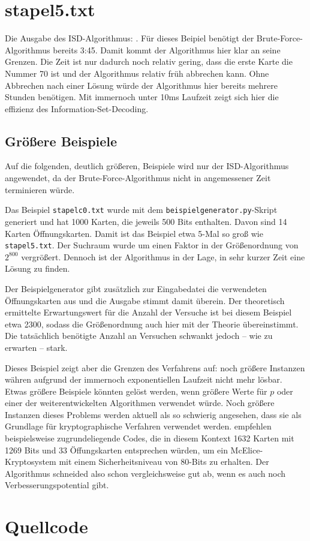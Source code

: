 \documentclass[a4paper,10pt,ngerman]{scrartcl}
\begin{document}
\section{stapel5.txt}
Die Ausgabe des ISD-Algorithmus:
.
Für dieses Beipiel benötigt der Brute-Force-Algorithmus bereits 3:45. Damit kommt der Algorithmus hier klar an seine Grenzen. Die Zeit ist nur dadurch noch relativ gering, dass die erste Karte die Nummer 70 ist und der Algorithmus relativ früh abbrechen kann. Ohne Abbrechen nach einer Lösung würde der Algorithmus hier bereits mehrere Stunden benötigen.
Mit immernoch unter 10ms Laufzeit zeigt sich hier die effizienz des Information-Set-Decoding.
\subsection{Größere Beispiele}
Auf die folgenden, deutlich größeren, Beispiele wird nur der ISD-Algorithmus angewendet, da der Brute-Force-Algorithmus nicht in angemessener Zeit terminieren würde.

Das Beispiel \texttt{stapelc0.txt} wurde mit dem \texttt{beispielgenerator.py}-Skript generiert und hat 1000 Karten, die jeweils 500 Bits enthalten. Davon sind 14 Karten Öffnungskarten. Damit ist das Beispiel etwa 5-Mal so groß wie \texttt{stapel5.txt}. Der Suchraum wurde um einen Faktor in der Größenordnung von $2^800$ vergrößert. Dennoch ist der Algorithmus in der Lage, in sehr kurzer Zeit eine Lösung zu finden.

Der Beispielgenerator gibt zusätzlich zur Eingabedatei die verwendeten Öffnungskarten aus und die Ausgabe stimmt damit überein. 
Der theoretisch ermittelte Erwartungswert für die Anzahl der Versuche ist bei diesem Beispiel etwa 2300, sodass die Größenordnung auch hier mit der Theorie übereinstimmt. Die tatsächlich benötigte Anzahl an Versuchen schwankt jedoch -- wie zu erwarten -- stark.

Dieses Beispiel zeigt aber die Grenzen des Verfahrens auf: noch größere Instanzen währen aufgrund der immernoch exponentiellen Laufzeit nicht mehr lösbar. Etwas größere Beispiele könnten gelöst werden, wenn größere Werte für $p$ oder einer der weiterentwickelten Algorithmen verwendet würde.
Noch größere Instanzen dieses Problems werden aktuell als so schwierig angesehen, dass sie als Grundlage für kryptographische Verfahren verwendet werden. \citeauthor{bernsteinAttackingDefendingMcEliece2008} empfehlen beispielsweise zugrundeliegende Codes, die in diesem Kontext 1632 Karten mit 1269 Bits und 33 Öffungskarten entsprechen würden, um ein McElice-Kryptosystem mit einem Sicherheitsniveau von 80-Bits zu erhalten. \cite{bernsteinAttackingDefendingMcEliece2008}
Der Algorithmus schneided also schon vergleichsweise gut ab, wenn es auch noch Verbesserungspotential gibt.
\section{Quellcode}



\printbibliography[heading=bibintoc]
\end{document}
